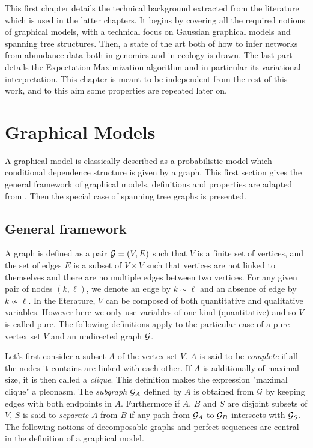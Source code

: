

This first chapter  details the technical background extracted from the literature which is used in the latter chapters. It begins by covering all the required notions of graphical models, with a technical focus on Gaussian graphical models and spanning tree structures. Then, a state of the art both of how to infer networks from abundance data both in genomics and in ecology is drawn. The last part details the Expectation-Maximization algorithm and in particular its variational interpretation. This chapter is meant to be independent from the rest of this work, and to this aim some properties are repeated later on.


 \section{Graphical Models}
 A graphical model is classically described as a probabilistic model which conditional dependence structure is given by a graph. This first section gives the general framework of graphical models, definitions and properties are adapted from \citet{Lau96}.  Then the special case of  spanning tree graphs is presented.
 \subsection{General framework}
 A graph is defined as a pair $\mathcal{G}=(V,E)$ such that $V$ is a finite set of vertices, and the set of edges $E$ is a subset of $V\times V$ such that vertices are not linked to themselves and there are no multiple edges between two vertices. For any given pair of nodes $(k,\ell)$, we denote an edge by $k\sim\ell$ and an absence of edge by $k\nsim \ell$. In the literature, $V$ can be composed of both quantitative and qualitative variables. However here we  only use variables of one kind (quantitative) and so $V$ is called pure. The following definitions apply to the particular case of a pure vertex set $V$ and an undirected graph $\mathcal{G}$.

Let's first consider a subset $A$ of the vertex set $V$. $A$ is said to be \textit{complete} if all the nodes it contains are linked with each other. If $A$ is additionally of maximal size, it is then called a \textit{clique}. This definition makes the expression "maximal clique" a pleonasm. The \textit{subgraph} $\mathcal{G}_A$ defined by $A$  is obtained from $\mathcal{G}$ by keeping edges with both endpoints in $A$. Furthermore if $A$, $B$ and $S$ are disjoint subsets of $V$, $S$ is said to \textit{separate} $A$ from $B$ if any path from $\mathcal{G}_A$ to $\mathcal{G}_B$ intersects with $\mathcal{G}_S$. The following notions of decomposable graphs and perfect sequences are central in the definition of a graphical model.
 

